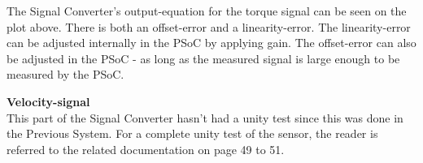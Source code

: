 The Signal Converter's output-equation for the torque signal can be seen on the plot above. There is both an offset-error and a linearity-error. The linearity-error can be adjusted internally in the PSoC by applying gain. The offset-error can also be adjusted in the PSoC - as long as the measured signal is large enough to be measured by the PSoC.

\textbf{Velocity-signal}\\
This part of the Signal Converter hasn't had a unity test since this was done in the Previous System\cite{BAC_rullefelt}. For a complete unity test of the sensor, the reader is referred to the related documentation on page 49 to 51.